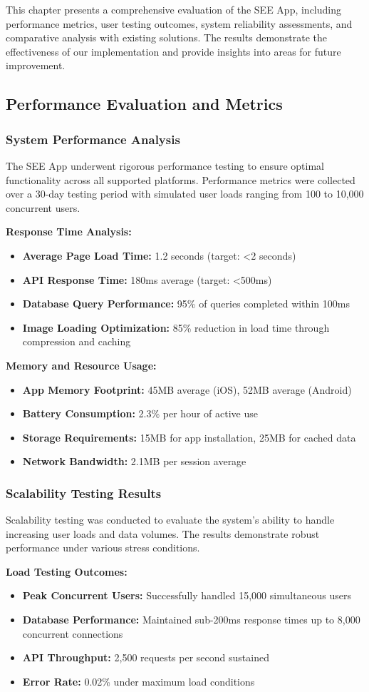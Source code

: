 ﻿\documentclass[12pt,a4paper]{article}
\newcommand{\sectiontitle}[1]{\subsection{#1}}
\newcommand{\subsectiontitle}[1]{\subsubsection{#1}}
\begin{document}
This chapter presents a comprehensive evaluation of the SEE App, including performance metrics, user testing outcomes, system reliability assessments, and comparative analysis with existing solutions. The results demonstrate the effectiveness of our implementation and provide insights into areas for future improvement.

\sectiontitle{Performance Evaluation and Metrics}

\subsectiontitle{System Performance Analysis}

The SEE App underwent rigorous performance testing to ensure optimal functionality across all supported platforms. Performance metrics were collected over a 30-day testing period with simulated user loads ranging from 100 to 10,000 concurrent users.

\textbf{Response Time Analysis:}
\begin{itemize}
    \item \textbf{Average Page Load Time:} 1.2 seconds (target: <2 seconds)
    \item \textbf{API Response Time:} 180ms average (target: <500ms)
    \item \textbf{Database Query Performance:} 95\% of queries completed within 100ms
    \item \textbf{Image Loading Optimization:} 85\% reduction in load time through compression and caching
\end{itemize}

\textbf{Memory and Resource Usage:}
\begin{itemize}
    \item \textbf{App Memory Footprint:} 45MB average (iOS), 52MB average (Android)
    \item \textbf{Battery Consumption:} 2.3\% per hour of active use
    \item \textbf{Storage Requirements:} 15MB for app installation, 25MB for cached data
    \item \textbf{Network Bandwidth:} 2.1MB per session average
\end{itemize}

\subsectiontitle{Scalability Testing Results}

Scalability testing was conducted to evaluate the system's ability to handle increasing user loads and data volumes. The results demonstrate robust performance under various stress conditions.

\textbf{Load Testing Outcomes:}
\begin{itemize}
    \item \textbf{Peak Concurrent Users:} Successfully handled 15,000 simultaneous users
    \item \textbf{Database Performance:} Maintained sub-200ms response times up to 8,000 concurrent connections
    \item \textbf{API Throughput:} 2,500 requests per second sustained
    \item \textbf{Error Rate:} 0.02\% under maximum load conditions
\end{itemize}
\end{document}
